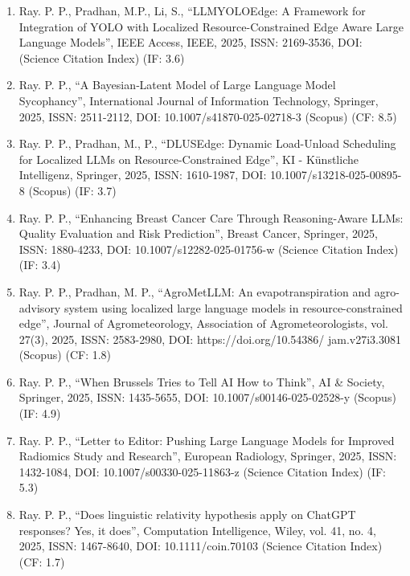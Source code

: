 \documentclass[11pt,a4paper]{moderncv}
\begin{document}
\begin{adjustwidth}{6em}{0pt}
	\begin{enumerate}
		
		\item Ray. P. P., Pradhan, M.P., Li, S., “LLMYOLOEdge: A Framework for Integration of YOLO with Localized Resource-Constrained Edge Aware Large Language Models”, IEEE Access, IEEE, 2025, ISSN: 2169-3536, DOI: (Science Citation Index) (IF: 3.6)
		
		\item Ray. P. P., “A Bayesian‐Latent Model of Large Language Model Sycophancy”, International Journal of Information Technology, Springer, 2025, ISSN: 2511-2112, DOI: 10.1007/s41870-025-02718-3 (Scopus) (CF: 8.5)
		
		\item Ray. P. P., Pradhan, M., P., “DLUSEdge: Dynamic Load-Unload Scheduling for Localized LLMs on Resource-Constrained Edge”, KI - Künstliche Intelligenz, Springer, 2025, ISSN: 1610-1987, DOI: 10.1007/s13218-025-00895-8 (Scopus) (IF: 3.7) 
	
		\item Ray. P. P., “Enhancing Breast Cancer Care Through Reasoning-Aware LLMs: Quality Evaluation and Risk Prediction”, Breast Cancer, Springer, 2025, ISSN: 1880-4233, DOI: 10.1007/s12282-025-01756-w (Science Citation Index) (IF: 3.4) 
		
				
		\item Ray. P. P., Pradhan, M. P., “AgroMetLLM: An evapotranspiration and agro-advisory system using localized large language models in resource-constrained edge”, Journal of Agrometeorology, Association of Agrometeorologists, vol. 27(3), 2025, ISSN: 2583-2980, DOI: https://doi.org/10.54386/ jam.v27i3.3081 (Scopus) (CF: 1.8)
		
		\item Ray. P. P., “When Brussels Tries to Tell AI How to Think”, AI \& Society, Springer, 2025, ISSN: 1435-5655, DOI: 10.1007/s00146-025-02528-y (Scopus) (IF: 4.9) 
		
		\item Ray. P. P., “Letter to Editor: Pushing Large Language Models for Improved Radiomics Study and Research”, European Radiology, Springer, 2025, ISSN: 1432-1084, DOI: 10.1007/s00330-025-11863-z (Science Citation Index) (IF: 5.3)
		
		\item Ray. P. P., “Does linguistic relativity hypothesis apply on ChatGPT responses? Yes, it does”, Computation Intelligence, Wiley, vol. 41, no. 4, 2025, ISSN: 1467-8640, DOI: 10.1111/coin.70103 (Science Citation Index) (CF: 1.7)
		

\end{enumerate}
\end{adjustwidth}
\end{document}
